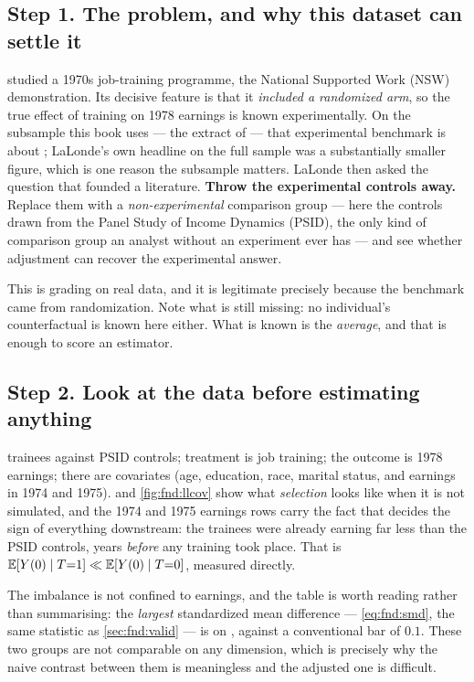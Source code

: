 \subsection*{Step 1. The problem, and why this dataset can settle it}

\citet{lalonde1986} studied a 1970s job-training programme, the National Supported Work (NSW)
demonstration. Its decisive feature is that it \emph{included a randomized arm}, so the true
effect of training on 1978 earnings is known experimentally. On the subsample this book uses ---
the extract of \citet{dehejia1999} --- that experimental benchmark is about
\usd{\nbZeroLlBenchmark}; LaLonde's own headline on the full sample was a substantially smaller
figure, which is one reason the subsample matters. LaLonde then asked the question that founded a
literature. \textbf{Throw the experimental controls away.} Replace them with a
\emph{non-experimental} comparison group --- here the controls drawn from the Panel Study of
Income Dynamics (PSID), the only kind of comparison group an analyst without an experiment ever
has --- and see whether adjustment can recover the experimental answer.

This is grading on real data, and it is legitimate precisely because the benchmark came from
randomization. Note what is still missing: no individual's counterfactual is known here either.
What is known is the \emph{average}, and that is enough to score an estimator.

\subsection*{Step 2. Look at the data before estimating anything}

\nbZeroLlTreated{} trainees against \nbZeroLlControl{} PSID controls; treatment is job
training; the outcome is 1978 earnings; there are \nbZeroLlNCovs{} covariates (age, education,
race, marital status, and earnings in 1974 and 1975).  and
\cref{fig:fnd:llcov} show what \emph{selection} looks like when it is not simulated, and the
1974 and 1975 earnings rows carry the fact that decides the sign of everything downstream: the
trainees were already earning far less than the PSID controls, years \emph{before} any
training took place. That is $\operatorname{\mathbb{E}}[Y(0) \mid T{=}1] \ll \operatorname{\mathbb{E}}[Y(0) \mid T{=}0]$, measured directly.

The imbalance is not confined to earnings, and the table is worth reading rather than
summarising: the \emph{largest} standardized mean difference --- \cref{eq:fnd:smd}, the same
statistic as \cref{sec:fnd:valid} --- is \nbZeroLlSmdWorst{} on \nbZeroLlSmdWorstName{}, against
a conventional bar of $0.1$. These two groups are not comparable on any dimension, which is
precisely why the naive contrast between them is meaningless and the adjusted one is difficult.

